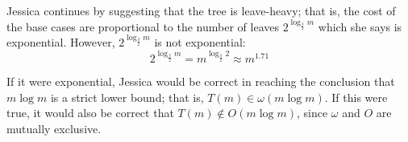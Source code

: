 Jessica continues by suggesting that the tree is leave-heavy; that is, the cost of the base cases are proportional to the number of leaves $2^{\log_{\frac{3}{2}}{m}}$ which she says is exponential. However, $2^{\log_{\frac{3}{2}}{m}}$ is not exponential:
$$
    2^{\log_{\frac{3}{2}}{m}} = m^{\log_{\frac{3}{2}}{2}} \approx m^{1.71}
$$

If it were exponential, Jessica would be correct in reaching the conclusion that $m \log{m}$ is a strict lower bound; that is, $T(m) \in \omega (m \log{m})$. If this were true, it would also be correct that $T(m) \notin O(m \log{m})$, since $\omega$ and $O$ are mutually exclusive.